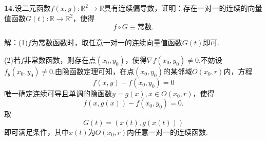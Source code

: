 \documentclass[12pt, a4paper]{article}
\newcommand{\RR}{\mathbb{R}}
\begin{document}
\textbf{14.}设二元函数\(f(x, y):\RR^2 \to \RR\)具有连续偏导数，证明：存在一对一的连续的向量值函数\(G(t):\RR \to \RR^2\)，使得
\[f \circ G \equiv \text{常数}.\]

解：(1)\(f\)为常数函数时，取任意一对一的连续向量值函数\(G(t)\)即可.

(2)若\(f\)非常数函数，则存在点\((x_0, y_0)\)，使得\(\nabla f(x_0, y_0) \neq 0\).不妨设\(f_y(x_0, y_0) \neq 0\).由隐函数定理可知，在点\((x_0, y_0)\)的某邻域\(O(x_0, r)\)内，方程
\[f(x, y) - f(x_0, y_0) = 0\]
唯一确定连续可导且单调的隐函数\(y = g(x), x \in O(x_0, r)\)，使得
\[f(x, g(x)) - f(x_0, y_0) = 0.\]
取
\[G(t) = (x(t), g(x(t)))\]
即可满足条件，其中\(x(t)\)为\(O(x_0, r)\)内任意一对一的连续函数.
\end{document}
